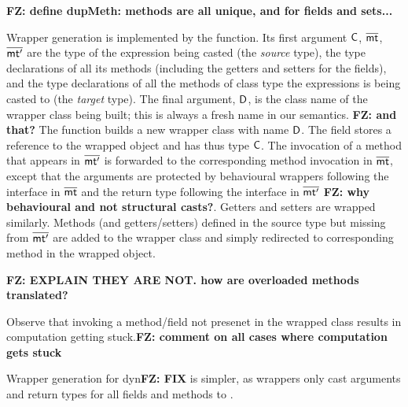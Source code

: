 \documentclass[acmlarge, anonymous, authordraft]{acmart}
\newcommand{\FZ}[1]{\textbf{FZ: #1}}
\begin{document}
\FZ{define dupMeth: methods are all unique, and for fields and sets...}



Wrapper generation is implemented by the  function.  Its first argument \({\sf{C}}\), \(\overline{{\sf{mt}}}\), \(\overline{{\sf{mt'}}}\) are the type of the expression being casted (the \emph{source} type), the type declarations of all its methods (including the getters and setters for the fields), and the type declarations of all the methods of class type the expressions is being casted to (the \emph{target} type).  The final argument, \({\sf{D}}\), is the class name  of the wrapper class being built; this is always a fresh name in our semantics. \FZ{and that?}  The function  builds a new wrapper class with name \({\sf{D}}\).  The field  stores a reference to the wrapped object and has thus type \({\sf{C}}\).  The invocation of a method that appears in \(\overline{{\sf{mt'}}}\) is forwarded to the corresponding method invocation in \(\overline{{\sf{mt}}}\), except that the arguments are protected by behavioural wrappers following the interface in \(\overline{{\sf{mt}}}\) and the return type following the interface in \(\overline{{\sf{mt'}}}\) \FZ{why behavioural and not structural casts?}.  Getters and setters are wrapped similarly.   Methods (and getters/setters) defined in the source type but missing from \(\overline{{\sf{mt'}}}\) are added to the wrapper class and simply redirected to corresponding method in the wrapped object.
 
 \FZ{EXPLAIN THEY ARE NOT. how are overloaded methods translated?} 






Observe that invoking a method/field not presenet in the wrapped class results in computation getting stuck.\FZ{comment on all cases where computation gets stuck}


Wrapper generation for dyn\FZ{FIX} is simpler, as wrappers only cast arguments and return types for all fields and methods to \any. 
%
%
% 
\end{document}
